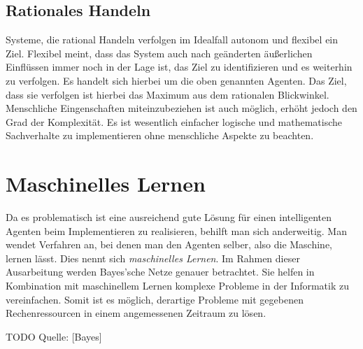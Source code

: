 \subsection{Rationales Handeln}
Systeme, die rational Handeln verfolgen im Idealfall autonom und flexibel ein Ziel. Flexibel meint, dass das System auch nach geänderten äußerlichen Einflüssen immer noch in der Lage ist, das Ziel zu identifizieren und es weiterhin zu verfolgen. Es handelt sich hierbei um die oben genannten Agenten. Das Ziel, dass sie verfolgen ist hierbei das Maximum aus dem rationalen Blickwinkel. Menschliche Eingenschaften miteinzubeziehen ist auch möglich, erhöht jedoch den Grad der Komplexität. Es ist wesentlich einfacher logische und mathematische Sachverhalte zu implementieren ohne menschliche Aspekte zu beachten.

\section{Maschinelles Lernen}
Da es problematisch ist eine ausreichend gute Lösung für einen intelligenten Agenten beim Implementieren zu realisieren, behilft man sich anderweitig. Man wendet Verfahren an, bei denen man den Agenten selber, also die Maschine, lernen lässt. Dies nennt sich \textit{maschinelles Lernen}.
Im Rahmen dieser Ausarbeitung werden Bayes'sche Netze genauer betrachtet. Sie helfen in Kombination mit maschinellem Lernen komplexe Probleme in der Informatik zu vereinfachen. Somit ist es möglich, derartige Probleme mit gegebenen Rechenressourcen in einem angemessenen Zeitraum zu lösen. 

TODO Quelle: [Bayes]





